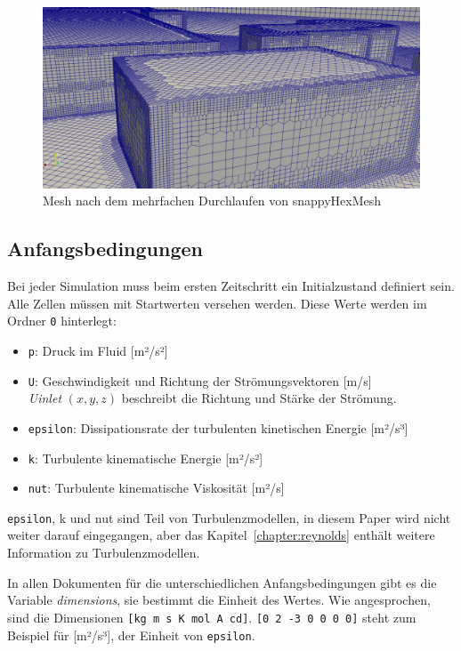 \begin{figure}
    \centering
    \includegraphics[width=\textwidth]{papers/openfoam/Bilder/Snappy_fein.png}
    \caption{Mesh nach dem mehrfachen Durchlaufen von snappyHexMesh}
    \label{fig:snappyfeinbild}
\end{figure}

\subsection{Anfangsbedingungen \label{openfoam:section:Anfangsbedingungen}}
Bei jeder Simulation muss beim ersten Zeitschritt ein Initialzustand definiert sein.
Alle Zellen müssen mit Startwerten versehen werden. 
Diese Werte werden im Ordner \texttt{0} hinterlegt:
\begin{itemize}
    \item \texttt{p}: Druck im Fluid [m²/s²]
    \item \texttt{U}: Geschwindigkeit und Richtung der Strömungsvektoren [m/s]\\
    \textit{Uinlet} $ (x, y, z) $ beschreibt die Richtung und Stärke der Strömung. 
    \item \texttt{epsilon}: Dissipationsrate der turbulenten kinetischen Energie [m²/s³]
    \item \texttt{k}: Turbulente kinematische Energie [m²/s²]
    \item \texttt{nut}: Turbulente kinematische Viskosität [m²/s]
\end{itemize}
\texttt{epsilon}, k und nut sind Teil von Turbulenzmodellen, in diesem Paper wird nicht weiter darauf eingegangen, aber das Kapitel~\ref{chapter:reynolds} enthält weitere Information zu Turbulenzmodellen.
%

In allen Dokumenten für die unterschiedlichen Anfangsbedingungen gibt es die Variable \textit{dimensions}, sie bestimmt die Einheit des Wertes.
%
Wie angesprochen, sind die Dimensionen \texttt{[kg m s K mol A cd]}.
\texttt{[0 2 -3 0 0 0 0]} steht zum Beispiel für [m²/s³], der Einheit von \texttt{epsilon}.

